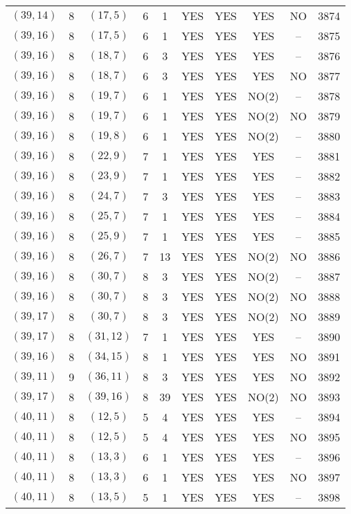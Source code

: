 \begin{longtable}{|c|c|c|c|c|c|c|c|c|c|}
$(39, 14)$ & 8 & $(17, 5)$ & 6 & 1 & YES & YES & YES & NO & 3874\\
$(39, 16)$ & 8 & $(17, 5)$ & 6 & 1 & YES & YES & YES & -- & 3875\\
$(39, 16)$ & 8 & $(18, 7)$ & 6 & 3 & YES & YES & YES & -- & 3876\\
$(39, 16)$ & 8 & $(18, 7)$ & 6 & 3 & YES & YES & YES & NO & 3877\\
$(39, 16)$ & 8 & $(19, 7)$ & 6 & 1 & YES & YES & NO(2) & -- & 3878\\
$(39, 16)$ & 8 & $(19, 7)$ & 6 & 1 & YES & YES & NO(2) & NO & 3879\\
$(39, 16)$ & 8 & $(19, 8)$ & 6 & 1 & YES & YES & NO(2) & -- & 3880\\
$(39, 16)$ & 8 & $(22, 9)$ & 7 & 1 & YES & YES & YES & -- & 3881\\
$(39, 16)$ & 8 & $(23, 9)$ & 7 & 1 & YES & YES & YES & -- & 3882\\
$(39, 16)$ & 8 & $(24, 7)$ & 7 & 3 & YES & YES & YES & -- & 3883\\
$(39, 16)$ & 8 & $(25, 7)$ & 7 & 1 & YES & YES & YES & -- & 3884\\
$(39, 16)$ & 8 & $(25, 9)$ & 7 & 1 & YES & YES & YES & -- & 3885\\
$(39, 16)$ & 8 & $(26, 7)$ & 7 & 13 & YES & YES & NO(2) & NO & 3886\\
$(39, 16)$ & 8 & $(30, 7)$ & 8 & 3 & YES & YES & NO(2) & -- & 3887\\
$(39, 16)$ & 8 & $(30, 7)$ & 8 & 3 & YES & YES & NO(2) & NO & 3888\\
$(39, 17)$ & 8 & $(30, 7)$ & 8 & 3 & YES & YES & NO(2) & NO & 3889\\
$(39, 17)$ & 8 & $(31, 12)$ & 7 & 1 & YES & YES & YES & -- & 3890\\
$(39, 16)$ & 8 & $(34, 15)$ & 8 & 1 & YES & YES & YES & NO & 3891\\
$(39, 11)$ & 9 & $(36, 11)$ & 8 & 3 & YES & YES & YES & NO & 3892\\
$(39, 17)$ & 8 & $(39, 16)$ & 8 & 39 & YES & YES & NO(2) & NO & 3893\\
$(40, 11)$ & 8 & $(12, 5)$ & 5 & 4 & YES & YES & YES & -- & 3894\\
$(40, 11)$ & 8 & $(12, 5)$ & 5 & 4 & YES & YES & YES & NO & 3895\\
$(40, 11)$ & 8 & $(13, 3)$ & 6 & 1 & YES & YES & YES & -- & 3896\\
$(40, 11)$ & 8 & $(13, 3)$ & 6 & 1 & YES & YES & YES & NO & 3897\\
$(40, 11)$ & 8 & $(13, 5)$ & 5 & 1 & YES & YES & YES & -- & 3898\\

\end{longtable}
